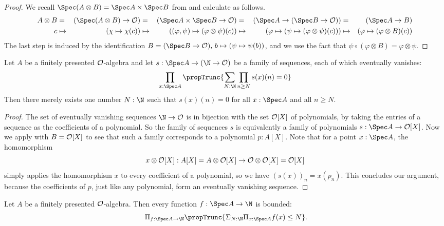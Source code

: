 \begin{proof}
  We recall $\Spec (A \otimes B) = \Spec A \times \Spec B$
  from 
  and calculate as follows.
  \begin{alignat*}{8}
    A \otimes B
    &=& (\Spec (A \otimes B) \to \A)
    &=& (\Spec A \times \Spec B \to \A)
    &=& (\Spec A \to (\Spec B \to \A))
    &=& (\Spec A \to B) \\
    c
    &\mapsto& (\chi \mapsto \chi(c))
    &\mapsto& ((\varphi, \psi) \mapsto (\varphi \otimes \psi)(c))
    &\mapsto& (\varphi \mapsto (\psi \mapsto (\varphi \otimes \psi)(c)))
    &\mapsto& (\varphi \mapsto (\varphi \otimes B)(c))
  \end{alignat*}
  The last step is induced by the identification
  $B = (\Spec B \to \A),\, b \mapsto (\psi \mapsto \psi(b))$,
  and we use the fact that
  $\psi \circ (\varphi \otimes B) = \varphi \otimes \psi$.
\end{proof}

\begin{lemma}%
  \label{eventually-vanishing-sequence-on-affine}
  Let $A$ be a finitely presented $\mathcal O$-algebra
  and let $s : \Spec A \to (\N \to \A)$
  be a family of sequences,
  each of which eventually vanishes:
  \[ \prod_{x : \Spec A} \propTrunc{\sum_{N : \N} \prod_{n \geq N} s(x)(n) = 0} \]
  Then there merely exists one number $N : \N$
  such that $s(x)(n) = 0$ for all $x : \Spec A$ and all $n \geq N$.
\end{lemma}

\begin{proof}
  The set of eventually vanishing sequences $\N \to \A$
  is in bijection with the set $\mathcal O[X]$ of polynomials,
  by taking the entries of a sequence as the coefficients of a polynomial.
  So the family of sequences $s$
  is equivalently a family of polynomials $s : \Spec A \to \A[X]$.
  Now we apply  with $B = \mathcal O[X]$
  to see that such a family corresponds to a polynomial $p : A[X]$.
  Note that for a point $x : \Spec A$,
  the homomorphism
  \[ x \otimes \mathcal O[X] : A[X] = A \otimes \mathcal O[X] \to \mathcal O \otimes \mathcal O[X] = \mathcal O[X] \]
  simply applies the homomorphism $x$ to every coefficient of a polynomial,
  so we have $(s(x))_n = x(p_n)$.
  This concludes our argument,
  because the coefficients of $p$,
  just like any polynomial,
  form an eventually vanishing sequence.
\end{proof}

\begin{theorem}%
  \label{boundedness}
  Let $A$ be a finitely presented $\mathcal O$-algebra.
  Then every function $f : \Spec A \to \N$ is bounded:
  \[ \Pi_{f : \Spec A \to \N} \propTrunc{\Sigma_{N : \N} \Pi_{x : \Spec A} f(x) \le N}
     \rlap{.} \]
\end{theorem}

